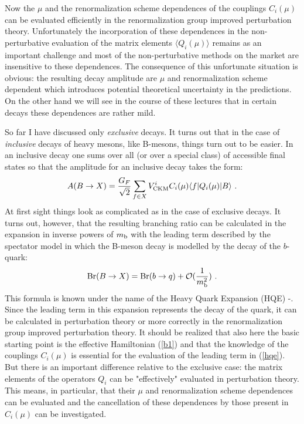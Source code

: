 \documentclass[12pt]{article}
\newcommand{\mb}{m_{\rm b}}
\newcommand{\be}{\begin{equation}}
\newcommand{\ee}{\end{equation}}
\newcommand{\ord}{{\cal O}}
\begin{document}
Now the $\mu$ and the renormalization scheme dependences of the couplings 
$C_i(\mu)$ can
be evaluated efficiently in the renormalization group improved perturbation
theory. Unfortunately the incorporation of these dependences in the
non-perturbative evaluation of the matrix elements  
$\langle Q_i(\mu)\rangle$
remains as an important
challenge and most of the non-perturbative methods on the market are
insensitive to these dependences. The consequence of this unfortunate
situation is obvious: the resulting decay amplitude are $\mu$ and 
renormalization
scheme dependent which introduces potential theoretical uncertainty in the
predictions. On the other hand we will see in the course of these lectures
that in certain decays these dependences are rather mild.

So far I have discussed only  {\it exclusive} decays. It turns out that
in the case of {\it inclusive} decays of heavy mesons, like B-mesons,
things turn out to be easier. In an inclusive decay one sums over all 
(or over
a special class) of accessible final states so that the amplitude for an
inclusive decay takes the form:
\be\label{ampi}
A(B\to X)
=\frac{G_F}{\sqrt{2}}\sum_{f\in X} 
V^i_{\rm CKM}C_i(\mu)\langle f|Q_i(\mu)|B\rangle~.
\ee
At first sight things look as complicated as in the case of exclusive decays.
It turns out, however, that the resulting branching ratio can be calculated
in the expansion in inverse powers of $\mb$ with the leading term 
described by the spectator model
in which the B-meson decay is modelled by the decay of the $b$-quark:
\be\label{hqe}
{\rm Br}(B\to X)={\rm Br}(b\to q) +\ord(\frac{1}{\mb^2})~. 
\ee
This formula is known under the name of the Heavy Quark Expansion (HQE)
\cite{HQE1}-\cite{HQE3}.
Since the leading term in this expansion represents the decay of the quark,
it can be calculated in perturbation theory or more correctly in the
renormalization group improved perturbation theory. It should be realized
that also here the basic starting point is the effective Hamiltonian 
 (\ref{b1})
and that the knowledge of the couplings $C_i(\mu)$ is essential for 
the evaluation of
the leading term in (\ref{hqe}). But there is an important difference 
relative to the
exclusive case: the matrix elements of the operators $Q_i$ can be 
"effectively"
evaluated in perturbation theory. 
This means, in particular, that their $\mu$ and renormalization scheme
dependences can be evaluated and the cancellation of these dependences by
those present in $C_i(\mu)$ can be investigated.
\end{document}
